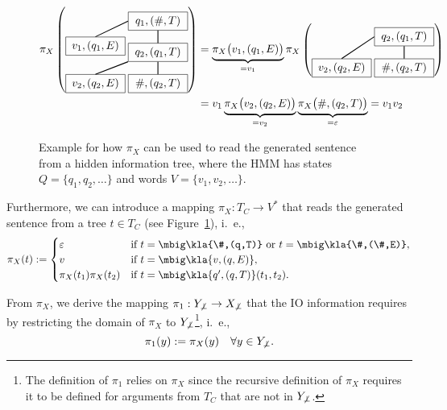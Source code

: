 \begin{figure}[t!]
 \begin{align*}
  \pi_X\left(\begin{tikzpicture}[every node/.style={rectangle,draw,minimum width=1.9cm},baseline=(current bounding box.center)]
   \node (t0) at (0,0) { $q_1,(\#,T)$ };
   \node (t1) at (0,-1) { $q_2,(q_1,T)$ } edge[thick] (t0);
   \node (t2) at (0,-2) { $\#,(q_2,T)$ } edge[thick] (t1);
   \node (e1) at (-2,-0.8) { $v_1,(q_1,E)$ }; \draw [thick] (t0.west) -- (e1.north);
   \node (e2) at (-2,-2) { $v_2,(q_2,E)$ }; \draw [thick] (t1.south west) -- (e2.north);
  \end{tikzpicture}\right)
  &=
   \underbrace{\pi_X\bigl(v_1,(q_1,E)\bigr)}_{=v_1}
   \pi_X\left(\begin{tikzpicture}[every node/.style={rectangle,draw,minimum width=1.9cm},baseline=(current bounding box.center)]
    \node (t1) at (0,0) { $q_2,(q_1,T)$ };
    \node (t2) at (0,-1) { $\#,(q_2,T)$ } edge[thick] (t1);
    \node (e2) at (-2,-1) { $v_2,(q_2,E)$ }; \draw [thick] (t1.west) -- (e2.north);
   \end{tikzpicture}\right)
  \\
  &= v_1
   \underbrace{\pi_X\bigl(v_2,(q_2,E)\bigr)}_{=v_2}
   \underbrace{\pi_X\bigl(\#,(q_2,T)\bigr)}_{=\eps}
   = v_1v_2
 \end{align*}
 \caption{\label{fig:03-readoff}%
  Example for how $\pi_X$ can be used to read the generated sentence from a hidden information tree, where the HMM has states $Q = \{q_1,q_2,\ldots\}$ and words $V = \{v_1,v_2,\ldots\}$.
 }
\end{figure}

\label{def:03-def-pi-x}
Furthermore, we can introduce a mapping $\pi_X: T_C \to V^*$ that reads the
generated sentence from a tree $t\in T_C$ (see Figure~\ref{fig:03-readoff}),
i.~e.,
\label{eq:03-pi_X}\[
 \pi_X(t) := \begin{cases}
  \eps & \text{if } t = \mbig\kla{\#,(q,T)} \text{ or } t = \mbig\kla{\#,(\#,E)}, \\
  v    & \text{if } t = \mbig\kla{v,(q,E)}, \\
  \pi_X(t_1)\pi_X(t_2) & \text{if } t = \mbig\kla{q',(q,T)}(t_1,t_2).
 \end{cases}
\]

From $\pi_X$, we derive the mapping $\pi_1: Y_{\not\bot} \to X_{\not\bot}$ that
the IO information requires by restricting the domain of $\pi_X$ to
$Y_{\not\bot}$\footnote{The definition of $\pi_1$ relies on $\pi_X$ since the
recursive definition of $\pi_X$ requires it to be defined for arguments from
$T_C$ that are not in $Y_{\not\bot}$.}, i.~e.,
\[
 \pi_1(y) := \pi_X(y) \quad\forall y\in Y_{\not\bot}.
\]


